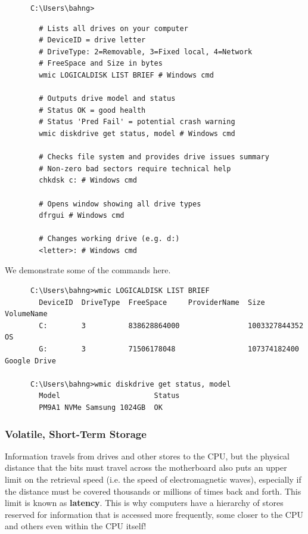 \documentclass{article}
\begin{document}
      \begin{lstlisting}
      C:\Users\bahng>
      \end{lstlisting}

      \begin{lstlisting}
        # Lists all drives on your computer
        # DeviceID = drive letter
        # DriveType: 2=Removable, 3=Fixed local, 4=Network
        # FreeSpace and Size in bytes
        wmic LOGICALDISK LIST BRIEF # Windows cmd

        # Outputs drive model and status
        # Status OK = good health
        # Status 'Pred Fail' = potential crash warning
        wmic diskdrive get status, model # Windows cmd

        # Checks file system and provides drive issues summary
        # Non-zero bad sectors require technical help
        chkdsk c: # Windows cmd

        # Opens window showing all drive types
        dfrgui # Windows cmd

        # Changes working drive (e.g. d:)
        <letter>: # Windows cmd
      \end{lstlisting}
  
      We demonstrate some of the commands here.
      \begin{lstlisting}
      C:\Users\bahng>wmic LOGICALDISK LIST BRIEF
        DeviceID  DriveType  FreeSpace     ProviderName  Size           VolumeName
        C:        3          838628864000                1003327844352  OS
        G:        3          71506178048                 107374182400   Google Drive

      C:\Users\bahng>wmic diskdrive get status, model
        Model                      Status
        PM9A1 NVMe Samsung 1024GB  OK
      \end{lstlisting}

    \subsubsection{Volatile, Short-Term Storage}

      Information travels from drives and other stores to the CPU, but the physical distance that the bits must travel across the motherboard also puts an upper limit on the retrieval speed (i.e. the speed of electromagnetic waves), especially if the distance must be covered thousands or millions of times back and forth. This limit is known as \textbf{latency}. This is why computers have a hierarchy of stores reserved for information that is accessed more frequently, some closer to the CPU and others even within the CPU itself!
\end{document}
